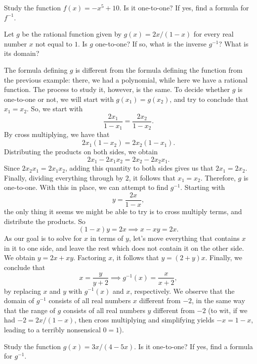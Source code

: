 \documentclass[nooutcomes]{ximera}
\begin{document}
\begin{exploration}
   Study the function $f(x) = -x^5 + 10$. Is it one-to-one? If yes, find a formula for $f^{-1}$.
\end{exploration}


\begin{example} 
  Let $g$ be the rational function given by $g(x) = 2x/(1-x)$ for every real number $x$ not equal to $1$. Is $g$ one-to-one? If so, what is the inverse $g^{-1}$? What is its domain?

  \begin{explanation}
    The formula defining $g$ is different from the formula defining the function from the previous example: there, we had a polynomial, while here we have a rational function. The process to study it, however, is the same. To decide whether $g$ is one-to-one or not, we will start with $g(x_1)=g(x_2)$, and try to conclude that $x_1=x_2$. So, we start with $$\frac{2x_1}{1-x_1} = \frac{2x_2}{1-x_2}.$$By cross multiplying, we have that $$2x_1(1-x_2) = 2x_2(1-x_1).$$Distributing the products on both sides, we obtain $$2x_1-2x_1x_2 = 2x_2-2x_2x_1.$$Since $2x_2x_1=2x_1x_2$, adding this quantity to both sides gives us that $2x_1=2x_2$. Finally, dividing everything through by $2$, it follows that $x_1=x_2$. Therefore, $g$ is one-to-one. With this in place, we can attempt to find $g^{-1}$. Starting with $$y = \frac{2x}{1-x},$$the only thing it seems we might be able to try is to cross multiply terms, and distribute the products. So $$(1-x)y = 2x \implies x-xy = 2x.$$As our goal is to solve for $x$ in terms of $y$, let's move everything that contains $x$ in it to one side, and leave the rest which does not contain it on the other side. We obtain $y = 2x+xy$. Factoring $x$, it follows that $y = (2+y)x$. Finally, we conclude that $$x=\frac{y}{y+2}\implies g^{-1}(x) = \frac{x}{x+2},$$by replacing $x$ and $y$ with $g^{-1}(x)$ and $x$, respectively. We observe that the domain of $g^{-1}$ consists of all real numbers $x$ different from $-2$, in the same way that the range of $g$ consists of all real numbers $y$ different from $-2$ (to wit, if we had $-2 = 2x/(1-x)$, then cross multiplying and simplifying yields $-x=1-x$, leading to a terribly nonsensical $0=1$).
  \end{explanation}
\end{example}

\begin{exploration}
  Study the function $g(x) = 3x/(4-5x)$. Is it one-to-one? If yes, find a formula for $g^{-1}$.
\end{exploration}
\end{document}
